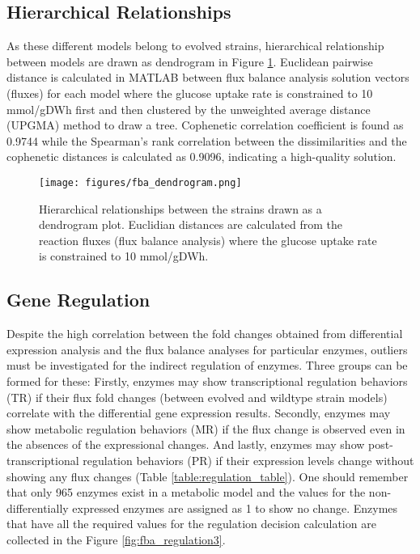  \subsection{Hierarchical Relationships}

As these different models belong to evolved strains, hierarchical relationship between models are drawn as dendrogram in Figure \ref{fig:fba_dendrogram}. Euclidean pairwise distance is calculated in MATLAB between flux balance analysis solution vectors (fluxes) for each model where the glucose uptake rate is constrained to 10 mmol/gDWh first and then clustered by the unweighted average distance (UPGMA) method to draw a tree. Cophenetic correlation coefficient is found as 0.9744 while the Spearman's rank correlation between the dissimilarities and the cophenetic distances is calculated as 0.9096, indicating a high-quality solution.

\begin{figure}[H]
  \begin{center}
  \texttt{[image: figures/fba\_dendrogram.png]}
  \caption[Hierarchical relationships between the strains drawn as a dendrogram plot. Euclidian distances are calculated from the reaction fluxes (flux balance analysis) where the glucose uptake rate is constrained to 10 mmol/gDWh]{Hierarchical relationships between the strains drawn as a dendrogram plot. Euclidian distances are calculated from the reaction fluxes (flux balance analysis) where the glucose uptake rate is constrained to 10 mmol/gDWh.}
  \label{fig:fba_dendrogram}
  \end{center}
\end{figure}

\subsection{Gene Regulation}

Despite the high correlation between the fold changes obtained from differential expression analysis and the flux balance analyses for particular enzymes, outliers must be investigated for the indirect regulation of enzymes. Three groups can be formed for these: Firstly, enzymes may show transcriptional regulation behaviors (TR) if their flux fold changes (between evolved and wildtype strain models) correlate with the differential gene expression results. Secondly, enzymes may show metabolic regulation behaviors (MR) if the flux change is observed even in the absences of the expressional changes. And lastly, enzymes may show post-transcriptional regulation behaviors (PR) if their expression levels change without showing any flux changes (Table \ref{table:regulation_table}). One should remember that only 965 enzymes exist in a metabolic model and the values for the non-differentially expressed enzymes are assigned as 1 to show no change. Enzymes that have all the required values for the regulation decision calculation are collected in the Figure \ref{fig:fba_regulation3}.

